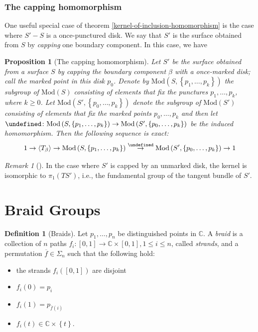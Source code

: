 \documentclass[reqno]{amsart}
\newtheorem{proposition}[theorem]{Proposition}
\theoremstyle{definition}
\newtheorem{definition}[theorem]{Definition}
\theoremstyle{remark}
\newtheorem*{remark}{Remark}
\newcommand{\Mod}{{\mathrm{Mod}}}
\let\Cap\undefined
\newcommand{\Cap}{{\mathcal{C}}ap}
\begin{document}
\subsubsection{The capping homomorphism}

One useful special case of theorem \ref{kernel-of-inclusion-homomorphism} is
the case where $S' - S$ is a once-punctured disk. We say that
$S'$ is the surface obtained from
$S$ by \textit{capping} one boundary component. In this
case, we have

\begin{proposition}[The capping homomorphism]
    Let $S'$ be the surface obtained from a surface
    $S$ by capping the boundary component $\beta $ with
    a once-marked disk; call the marked point in this disk
    $p_0$. Denote by 
    $\Mod \left( S, \left\{ p_1, \ldots, p_k \right\}  \right) $ 
    the subgroup of $\Mod(S)$ consisting of elements
    that fix the punctures $p_1, \ldots, p_k$, where
    $k \ge 0$. Let
    $\Mod \left( S', \left\{ p_0, \ldots, p_k \right\}  \right) $ 
    denote the subgroup of $\Mod(S')$ consisting
    of elements that fix the marked points
    $p_0, \ldots, p_k$ and then let
    $\Cap \colon \Mod \left( S, \left\{ p_1, \ldots,
    p_k \right\}  \right) \to \Mod \left( S',
    \left\{ p_0, \ldots, p_k \right\} \right) $ be the
    induced homomorphism. Then the following
    sequence is exact:
    \[
    1 \to 
    \left<T_{\beta} \right>
    \to \Mod \left( S, \left\{ p_1, \ldots, p_k \right\}  \right) 
    \stackrel{\Cap}{\to}  
    \Mod \left( S', \left\{ p_0, \ldots, p_k \right\}  \right) 
    \to 1
    \] 
\end{proposition}

\begin{remark}[]
In the case where $S'$ is capped by an
unmarked disk, the kernel is isomorphic to 
$\pi_1 \left( TS' \right) $, i.e., the fundamental group
of the tangent bundle of $S'$.
\end{remark}



\section{Braid Groups}


\begin{definition}[Braids]
    Let $p_1, \ldots, p_n$ be distinguished points
    in $\mathbb{C}$. A \textit{braid} is a collection
    of $n$ paths $f_i \colon \left[ 0,1 \right] 
    \to \mathbb{C} \times \left[ 0,1 \right] , 1\le i \le n$,
    called \textit{strands}, and a
    permutation $\overline{f}
    \in \Sigma_n$ such that the following hold:
    \begin{itemize}
        \item the strands 
            $f_i \left( \left[ 0,1 \right]  \right) $ are
            disjoint
        \item $f_i (0) = p_i$ 
        \item $f_i (1) = p_{\overline{f}(i)}$ 
        \item $f_i (t) \in \mathbb{C} \times \left\{ t \right\} $.
    \end{itemize}
\end{definition}
\end{document}
